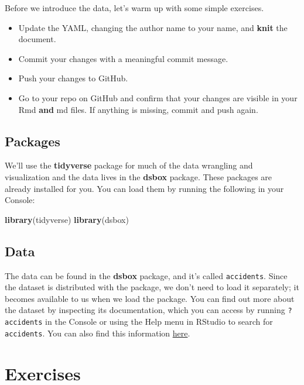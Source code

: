 \documentclass[
]{article}
\newenvironment{Shaded}{\begin{snugshade}}{\end{snugshade}}
\newcommand{\FunctionTok}[1]{\textcolor[rgb]{0.13,0.29,0.53}{\textbf{#1}}}
\newcommand{\NormalTok}[1]{#1}
\providecommand{\tightlist}{%
  \setlength{\itemsep}{0pt}\setlength{\parskip}{0pt}}
\begin{document}
Before we introduce the data, let's warm up with some simple exercises.

\begin{itemize}
\tightlist
\item
  Update the YAML, changing the author name to your name, and
  \textbf{knit} the document.
\item
  Commit your changes with a meaningful commit message.
\item
  Push your changes to GitHub.
\item
  Go to your repo on GitHub and confirm that your changes are visible in
  your Rmd \textbf{and} md files. If anything is missing, commit and
  push again.
\end{itemize}

\subsection{Packages}\label{packages}

We'll use the \textbf{tidyverse} package for much of the data wrangling
and visualization and the data lives in the \textbf{dsbox} package.
These packages are already installed for you. You can load them by
running the following in your Console:

\begin{Shaded}
\begin{Highlighting}[]
\FunctionTok{library}\NormalTok{(tidyverse)}
\FunctionTok{library}\NormalTok{(dsbox)}
\end{Highlighting}
\end{Shaded}

\subsection{Data}\label{data}

The data can be found in the \textbf{dsbox} package, and it's called
\texttt{accidents}. Since the dataset is distributed with the package,
we don't need to load it separately; it becomes available to us when we
load the package. You can find out more about the dataset by inspecting
its documentation, which you can access by running \texttt{?accidents}
in the Console or using the Help menu in RStudio to search for
\texttt{accidents}. You can also find this information
\href{https://rstudio-education.github.io/dsbox/reference/accidents.html}{here}.

\section{Exercises}\label{exercises}
\end{document}
